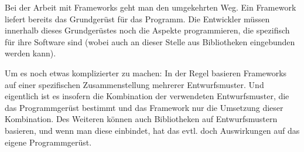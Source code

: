 Bei der Arbeit  mit Frameworks geht man den umgekehrten Weg. Ein Framework liefert bereits das Grundgerüst für das Programm. Die Entwickler müssen innerhalb dieses Grundgerüstes noch die Aspekte programmieren, die spezifisch für ihre Software sind (wobei auch an dieser Stelle aus Bibliotheken eingebunden werden kann).

Um es noch etwas komplizierter zu machen: In der Regel basieren Frameworks auf einer spezifischen Zusammenstellung mehrerer Entwurfsmuster. Und eigentlich ist es insofern die Kombination der verwendeten Entwurfsmuster, die das Programmgerüst bestimmt und das Framework nur die Umsetzung dieser Kombination. Des Weiteren können auch Bibliotheken auf Entwurfsmustern basieren, und wenn man diese einbindet, hat das evtl. doch Auswirkungen auf das eigene Programmgerüst.
